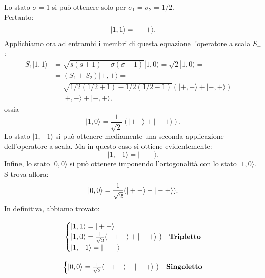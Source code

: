 \documentclass[a4paper,12pt,oneside]{book}
\begin{document}
Lo stato $\sigma=1$ si può ottenere solo per $\sigma_1=\sigma_2=1/2$. \\
Pertanto:\\
\begin{equation}
|1,1\rangle = |++\rangle  .\\
\end{equation}
Applichiamo ora ad entrambi i membri di questa equazione l'operatore a scala $S_-$:
\begin{align}
 S_1 |1,1\rangle & = \sqrt{s(s+1) - \sigma(\sigma -1)}  |1,0\rangle =\sqrt{2}  |1,0\rangle= \nonumber \\
&= (S_1+S_2)  |+,+\rangle = \nonumber \\
&= \sqrt{1/2 (1/2+1) -1/2 (1/2-1)} ( |+,-\rangle + |-,+\rangle)= \nonumber \\
&= |+,-\rangle   +   |-,+\rangle ,
\end{align}
ossia
\begin{equation}
|1,0\rangle = \frac{1}{\sqrt{2}} (|+-\rangle + |-+\rangle) .
\end{equation}
Lo stato $|1,-1\rangle$ si può ottenere mediamente una seconda applicazione dell'operatore a scala. Ma in questo caso si ottiene evidentemente:
\begin{equation}
|1,-1\rangle = |--\rangle .
\end{equation}
Infine, lo stato $|0,0\rangle$ si può ottenere imponendo l'ortogonalità con lo stato $|1,0\rangle$. S trova allora:
\begin{equation}
|0,0\rangle = \frac{1}{\sqrt{2}} (|+-\rangle - |-+\rangle). \\
\end{equation}
In definitiva, abbiamo trovato:

\begin{align}
\begin{cases} 
|1,1\rangle = |++\rangle \nonumber \\
|1,0\rangle = \frac{1}{\sqrt{2}} (~|+-\rangle + |-+\rangle ~)  \nonumber  & \mbox{\textrm{\textbf{Tripletto}}} \\
|1,-1\rangle = |--\rangle  \nonumber \\
\end{cases}
\end{align}

\begin{align}
\begin{cases} 
|0,0\rangle = \frac{1}{\sqrt{2}} (~|+-\rangle - |-+\rangle~) \nonumber  & \mbox{\textrm{\textbf{Singoletto}}}\\
\end{cases}
\end{align}
\end{document}
